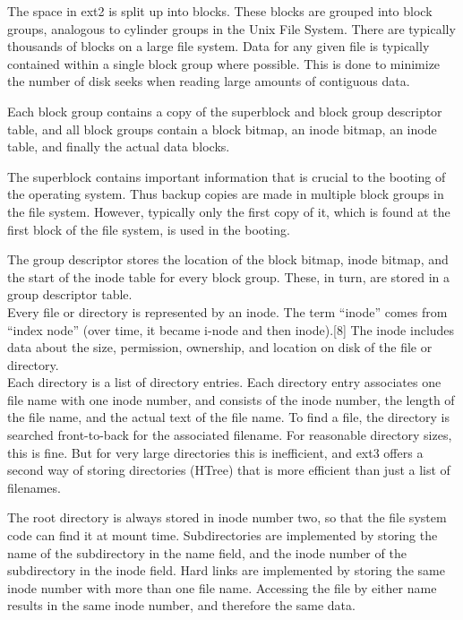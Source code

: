 \documentclass{article}
\begin{document}
The space in ext2 is split up into blocks. These blocks are grouped into block groups, analogous to cylinder groups in the Unix File System. There are typically thousands of blocks on a large file system. Data for any given file is typically contained within a single block group where possible. This is done to minimize the number of disk seeks when reading large amounts of contiguous data.

Each block group contains a copy of the superblock and block group descriptor table, and all block groups contain a block bitmap, an inode bitmap, an inode table, and finally the actual data blocks.

The superblock contains important information that is crucial to the booting of the operating system. Thus backup copies are made in multiple block groups in the file system. However, typically only the first copy of it, which is found at the first block of the file system, is used in the booting.

The group descriptor stores the location of the block bitmap, inode bitmap, and the start of the inode table for every block group. These, in turn, are stored in a group descriptor table.\\

Every file or directory is represented by an inode. The term ``inode'' comes from ``index node'' (over time, it became i-node and then inode).[8] The inode includes data about the size, permission, ownership, and location on disk of the file or directory.\\

Each directory is a list of directory entries. Each directory entry associates one file name with one inode number, and consists of the inode number, the length of the file name, and the actual text of the file name. To find a file, the directory is searched front-to-back for the associated filename. For reasonable directory sizes, this is fine. But for very large directories this is inefficient, and ext3 offers a second way of storing directories (HTree) that is more efficient than just a list of filenames.

The root directory is always stored in inode number two, so that the file system code can find it at mount time. Subdirectories are implemented by storing the name of the subdirectory in the name field, and the inode number of the subdirectory in the inode field. Hard links are implemented by storing the same inode number with more than one file name. Accessing the file by either name results in the same inode number, and therefore the same data.
\end{document}
